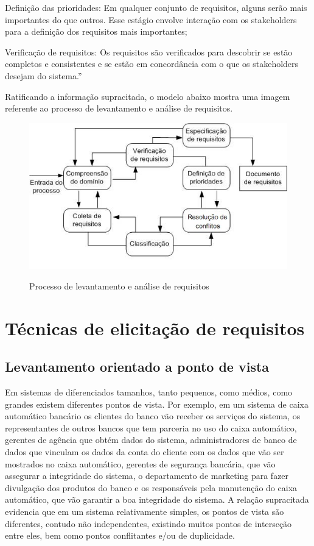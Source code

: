 Definição das prioridades: Em qualquer conjunto de requisitos, alguns serão mais importantes do que outros. Esse estágio envolve interação com os stakeholders para a definição dos requisitos mais importantes;

Verificação de requisitos: Os requisitos são verificados para descobrir se estão completos e consistentes e se estão em concordância com o que os stakeholders desejam do sistema.”

Ratificando a informação supracitada, o modelo abaixo mostra uma imagem referente ao processo de levantamento e análise de requisitos.

\FloatBarrier
\begin{figure}[!htpd]
		\centering
		\includegraphics[scale=1.0]{figuras/analise}
		\label{img:a}
		\caption{Processo de levantamento e análise de requisitos}
\end{figure}
\FloatBarrier


\section {Técnicas de elicitação de requisitos}

\subsection {Levantamento orientado a ponto de vista}

Em sistemas de diferenciados tamanhos, tanto pequenos, como médios, como grandes existem diferentes pontos de vista. Por exemplo, em um sistema de caixa automático bancário os clientes do banco vão receber os serviços do sistema, os representantes de outros bancos que tem parceria no uso do caixa automático, gerentes de agência que obtém dados do sistema, administradores de banco de dados que vinculam os dados da conta do cliente com os dados que vão ser mostrados no caixa automático, gerentes de segurança bancária, que vão assegurar a integridade do sistema, o departamento de marketing para fazer divulgação dos produtos do banco e os responsáveis pela manutenção do caixa automático, que vão garantir a boa integridade do sistema. A relação supracitada evidencia que em um sistema relativamente simples, os pontos de vista são diferentes, contudo não independentes, existindo muitos pontos de interseção entre eles, bem como pontos conflitantes e/ou de duplicidade.

